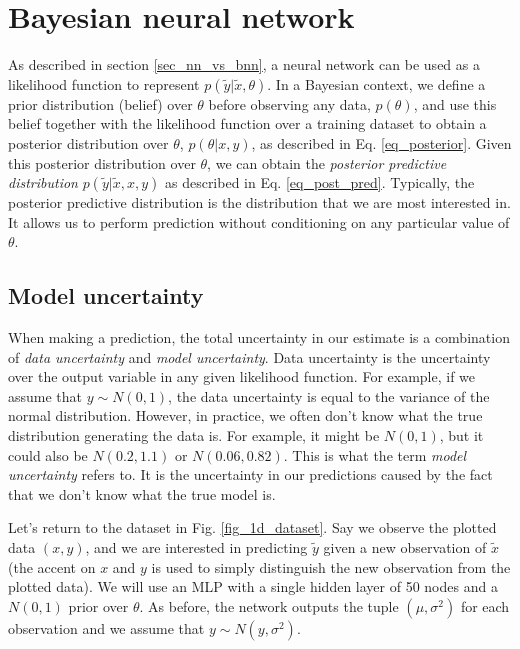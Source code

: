 \documentclass[12pt]{article}
\begin{document}
\section{Bayesian neural network}
\label{sec_bnn}

As described in section \ref{sec_nn_vs_bnn}, a neural network can be used as a likelihood function to represent $p(\tilde{y} | \tilde{x}, \theta)$. In a Bayesian context, we define a prior distribution (belief) over $\theta$ before observing any data, $p(\theta)$, and use this belief together with the likelihood function over a training dataset to obtain a posterior distribution over $\theta$, $p(\theta | x, y)$, as described in Eq. \ref{eq_posterior}. Given this posterior distribution over $\theta$, we can obtain the \textit{posterior predictive distribution} $p(\tilde{y} | \tilde{x}, x, y)$ as described in Eq. \ref{eq_post_pred}. Typically, the posterior predictive distribution is the distribution that we are most interested in. It allows us to perform prediction without conditioning on any particular value of $\theta$.

\subsection{Model uncertainty}
\label{sec_model_uncertain}

When making a prediction, the total uncertainty in our estimate is a combination of \textit{data uncertainty} and \textit{model uncertainty}. Data uncertainty is the uncertainty over the output variable in any given likelihood function. For example, if we assume that $y \sim N(0, 1)$, the data uncertainty is equal to the variance of the normal distribution. However, in practice, we often don't know what the true distribution generating the data is. For example, it might be $N(0, 1)$, but it could also be $N(0.2, 1.1)$ or $N(0.06, 0.82)$. This is what the term \textit{model uncertainty} refers to. It is the uncertainty in our predictions caused by the fact that we don't know what the true model is.

Let's return to the dataset in Fig. \ref{fig_1d_dataset}. Say we observe the plotted data $(x, y)$, and we are interested in predicting $\tilde{y}$ given a new observation of $\tilde{x}$ (the accent on $x$ and $y$ is used to simply distinguish the new observation from the plotted data). We will use an MLP with a single hidden layer of 50 nodes and a $N(0, 1)$ prior over $\theta$. As before, the network outputs the tuple $(\mu, \sigma^2)$ for each observation and we assume that $y \sim N(y, \sigma^2)$.
\end{document}
